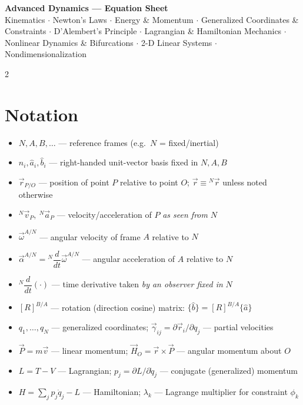 \documentclass[10pt]{article}
\newcommand{\rate}[2]{{}^{#1}\dfrac{d}{dt}#2}
\begin{document}
\thispagestyle{fancy}
\begin{center}
    {\Large\bfseries Advanced Dynamics --- Equation Sheet}\\[1pt]
    {\small Kinematics \(\cdot\) Newton's Laws \(\cdot\) Energy \& Momentum \(\cdot\) Generalized Coordinates \& Constraints \(\cdot\) D'Alembert's Principle \(\cdot\) Lagrangian \& Hamiltonian Mechanics \(\cdot\) Nonlinear Dynamics \& Bifurcations \(\cdot\) 2-D Linear Systems \(\cdot\) Nondimensionalization}
\end{center}
\vspace{-8pt}

\begin{multicols}{2}
\footnotesize

\section*{Notation}
\begin{itemize}[nosep, leftmargin=1.1em]
    \item $N, A, B,\dots$ --- reference frames (e.g.\ $N$ = fixed/inertial)
    \item $\hat n_i, \hat a_i, \hat b_i$ --- right-handed unit-vector basis fixed in $N,A,B$
    \item $\vec r_{P/O}$ --- position of point $P$ relative to point $O$; $\vec r\equiv{}^{N}\vec r$ unless noted otherwise
    \item ${}^{N}\vec v_P,\ {}^{N}\vec a_P$ --- velocity/acceleration of $P$ \emph{as seen from} $N$
    \item $\vec\omega^{A/N}$ --- angular velocity of frame $A$ relative to $N$
    \item $\vec\alpha^{A/N} = {}^{N}\dfrac{d}{dt}\vec\omega^{A/N}$ --- angular acceleration of $A$ relative to $N$
    \item $\rate{N}{(\cdot)}$ --- time derivative taken \emph{by an observer fixed in} $N$
    \item $[R]^{B/A}$ --- rotation (direction cosine) matrix: $\{\hat b\} = [R]^{B/A}\{\hat a\}$
    \item $q_1,\dots,q_N$ --- generalized coordinates; $\vec\gamma_{ij}=\partial\vec r_i/\partial q_j$ --- partial velocities
    \item $\vec P = m\vec v$ --- linear momentum; $\vec H_O=\vec r\times\vec P$ --- angular momentum about $O$
    \item $L=T-V$ --- Lagrangian; $p_j=\partial L/\partial\dot q_j$ --- conjugate (generalized) momentum
    \item $H=\sum_jp_j\dot q_j-L$ --- Hamiltonian; $\lambda_k$ --- Lagrange multiplier for constraint $\phi_k$
\end{itemize}


\end{multicols}
\end{document}
